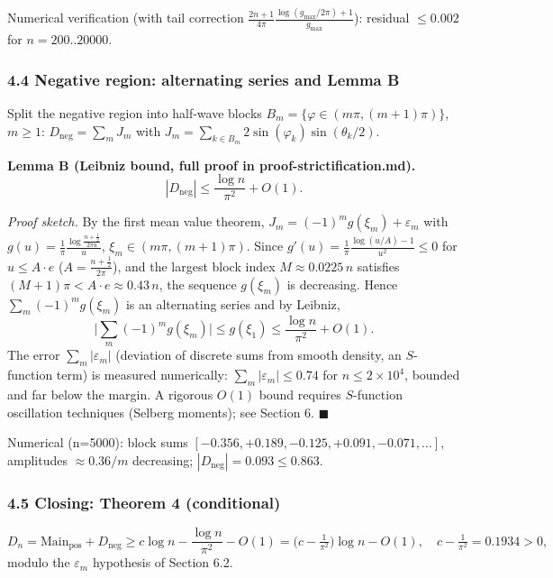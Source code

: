 \documentclass[
]{article}
\begin{document}
Numerical verification (with tail correction
\(\frac{2n+1}{4\pi}\frac{\log(g_{\max}/2\pi)+1}{g_{\max}}\)): residual
\(\le 0.002\) for \(n = 200..20000\).

\hypertarget{negative-region-alternating-series-and-lemma-b}{%
\subsubsection{4.4 Negative region: alternating series and Lemma
B}\label{negative-region-alternating-series-and-lemma-b}}

Split the negative region into half-wave blocks
\(B_m = \{\varphi \in (m\pi, (m+1)\pi)\}\), \(m \ge 1\):
\(D_{\mathrm{neg}} = \sum_m J_m\) with
\(J_m = \sum_{k\in B_m} 2\sin(\varphi_k)\sin(\theta_k/2)\).

\textbf{Lemma B (Leibniz bound, full proof in
proof-strictification.md).}
\[|D_{\mathrm{neg}}| \le \frac{\log n}{\pi^2} + O(1).\]

\emph{Proof sketch.} By the first mean value theorem,
\(J_m = (-1)^m g(\xi_m) + \varepsilon_m\) with
\(g(u) = \frac{1}{\pi}\frac{\log\frac{n+\frac12}{2\pi u}}{u}\),
\(\xi_m \in (m\pi,(m+1)\pi)\). Since
\(g'(u) = \frac{1}{\pi}\frac{\log(u/A)-1}{u^2} \le 0\) for
\(u \le A\cdot e\) (\(A = \frac{n+\frac12}{2\pi}\)), and the largest
block index \(M \approx 0.0225\,n\) satisfies
\((M+1)\pi < A\cdot e \approx 0.43\,n\), the sequence \(g(\xi_m)\) is
decreasing. Hence \(\sum_m (-1)^m g(\xi_m)\) is an alternating series
and by Leibniz,
\[\Big|\sum_m (-1)^m g(\xi_m)\Big| \le g(\xi_1) \le \frac{\log n}{\pi^2} + O(1).\]
The error \(\sum_m|\varepsilon_m|\) (deviation of discrete sums from
smooth density, an \(S\)-function term) is measured numerically:
\(\sum_m|\varepsilon_m| \le 0.74\) for \(n \le 2\times10^4\), bounded
and far below the margin. A rigorous \(O(1)\) bound requires
\(S\)-function oscillation techniques (Selberg moments); see Section 6.
\(\blacksquare\)

Numerical (n=5000): block sums
\([-0.356, +0.189, -0.125, +0.091, -0.071, \ldots]\), amplitudes
\(\approx 0.36/m\) decreasing; \(|D_{\mathrm{neg}}| = 0.093 \le 0.863\).

\hypertarget{closing-theorem-4-conditional}{%
\subsubsection{4.5 Closing: Theorem 4
(conditional)}\label{closing-theorem-4-conditional}}

\[D_n = \mathrm{Main}_{\mathrm{pos}} + D_{\mathrm{neg}} \ge c\log n - \frac{\log n}{\pi^2} - O(1) = \big(c - \tfrac{1}{\pi^2}\big)\log n - O(1), \quad c - \tfrac{1}{\pi^2} = 0.1934 > 0,\]
modulo the \(\varepsilon_m\) hypothesis of Section 6.2.
\end{document}
